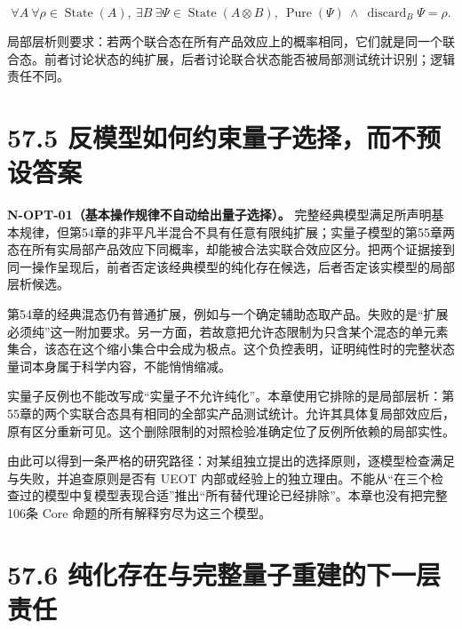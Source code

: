 \documentclass[
  11pt,
  oneside]{book}
\begin{document}
\[
\forall A\ \forall\rho\in\operatorname{State}(A),\
\exists B\ \exists\Psi\in\operatorname{State}(A\otimes B),\
\operatorname{Pure}(\Psi)\ \land\ \operatorname{discard}_{B}\Psi=\rho.
\]

局部层析则要求：若两个联合态在所有产品效应上的概率相同，它们就是同一个联合态。前者讨论状态的纯扩展，后者讨论联合状态能否被局部测试统计识别；逻辑责任不同。

\hypertarget{ux53cdux6a21ux578bux5982ux4f55ux7ea6ux675fux91cfux5b50ux9009ux62e9ux800cux4e0dux9884ux8bbeux7b54ux6848}{%
\section{57.5
反模型如何约束量子选择，而不预设答案}\label{ux53cdux6a21ux578bux5982ux4f55ux7ea6ux675fux91cfux5b50ux9009ux62e9ux800cux4e0dux9884ux8bbeux7b54ux6848}}

\protect\hypertarget{n-opt-01}{}{}

\textbf{N-OPT-01（基本操作规律不自动给出量子选择）。}
完整经典模型满足所声明基本规律，但第54章的非平凡半混合不具有任意有限纯扩展；实量子模型的第55章两态在所有实局部产品效应下同概率，却能被合法实联合效应区分。把两个证据接到同一操作呈现后，前者否定该经典模型的纯化存在候选，后者否定该实模型的局部层析候选。

第54章的经典混态仍有普通扩展，例如与一个确定辅助态取产品。失败的是``扩展必须纯''这一附加要求。另一方面，若故意把允许态限制为只含某个混态的单元素集合，该态在这个缩小集合中会成为极点。这个负控表明，证明纯性时的完整状态量词本身属于科学内容，不能悄悄缩减。

实量子反例也不能改写成``实量子不允许纯化''。本章使用它排除的是局部层析：第55章的两个实联合态具有相同的全部实产品测试统计。允许其具体复局部效应后，原有区分重新可见。这个删除限制的对照检验准确定位了反例所依赖的局部实性。

由此可以得到一条严格的研究路径：对某组独立提出的选择原则，逐模型检查满足与失败，并追查原则是否有
UEOT
内部或经验上的独立理由。不能从``在三个检查过的模型中复模型表现合适''推出``所有替代理论已经排除''。本章也没有把完整106条
Core 命题的所有解释穷尽为这三个模型。

\hypertarget{ux7eafux5316ux5b58ux5728ux4e0eux5b8cux6574ux91cfux5b50ux91cdux5efaux7684ux4e0bux4e00ux5c42ux8d23ux4efb}{%
\section{57.6
纯化存在与完整量子重建的下一层责任}\label{ux7eafux5316ux5b58ux5728ux4e0eux5b8cux6574ux91cfux5b50ux91cdux5efaux7684ux4e0bux4e00ux5c42ux8d23ux4efb}}
\end{document}

